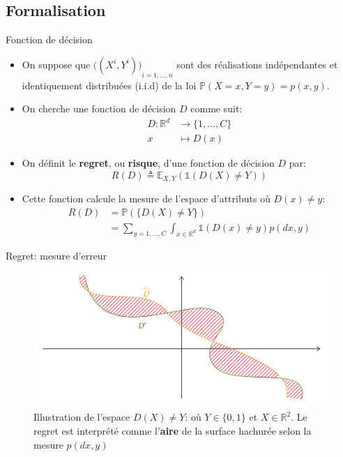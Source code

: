 \documentclass[8pt]{beamer}
\begin{document}
		\subsection{Formalisation}
			\begin{frame}{Fonction de décision}
				\begin{itemize}
					\item<1-> On suppose que ${\big((X^i, Y^i)\big)}_{i=1,\dots,n}$ sont des réalisations indépendantes et identiquement distribuées (i.i.d) de la loi $\mathbb{P}(X=x, Y=y) = p(x,y)$.
					\item<2-> On cherche une fonction de décision $D$ comme suit:
					\begin{align*}
						D: \mathbb{R}^d &\rightarrow \{1, \dots, C\} \\
						x &\mapsto D(x)
					\end{align*}
					\item<3-> On définit le \textbf{regret}, ou \textbf{risque}, d'une fonction de décision $D$ par:
					\begin{equation}
						R(D) \triangleq \mathbb{E}_{X,Y}(\mathbb{1}(D(X)\neq Y))
					\end{equation}
					\item<4-> Cette fonction calcule la mesure de l'espace d'attributs où $D(x) \neq y$:
					\begin{align*}
						R(D) &= \mathbb{P}(\{D(X)\neq Y\})\\
							&= \sum_{y = 1, \dots, C} \int_{x \in \mathbb{R}^d} \mathbb{1}(D(x)\neq y) p(dx, y)
					\end{align*}
				\end{itemize}
			\end{frame}
			\begin{frame}{Regret: mesure d'erreur}
				\begin{center}
					\begin{figure}[H]
						\includegraphics[width=.8\textwidth]{images/samples/illustration_difference_separator.png}
						\caption*{Illustration de l'espace \(D(X)\neq Y\): où \(Y \in \{0, 1\}\) et \(X \in \mathbb{R}^2\). Le regret est interprété comme l'\textbf{aire} de la surface hachurée selon la mesure \(p(dx, y)\)}
					\end{figure}	
				\end{center}
			\end{frame}
\end{document}
